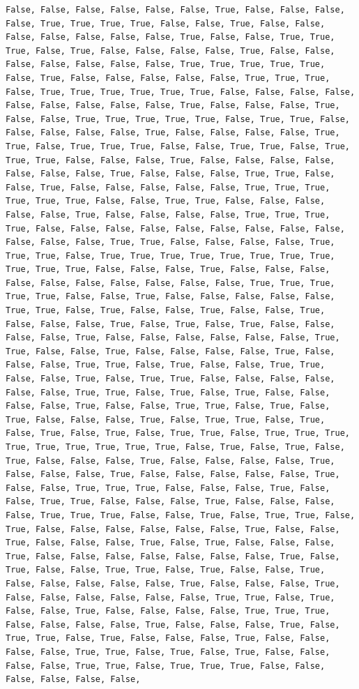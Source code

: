 \documentclass[
  letterpaper,
  DIV=11,
  numbers=noendperiod]{scrartcl}
\begin{document}
\begin{verbatim}
False, False, False, False, False, False, True, False, False, False, False, True, True, True, True, False, False, True, False, False, False, False, False, False, False, True, False, False, True, True, True, False, True, False, False, False, False, True, False, False, False, False, False, False, False, True, True, True, True, True, False, True, False, False, False, False, False, True, True, True, False, True, True, True, True, True, True, False, False, False, False, False, False, False, False, False, True, False, False, False, True, False, False, True, True, True, True, True, False, True, True, False, False, False, False, False, True, False, False, False, False, True, True, False, True, True, True, False, False, True, True, False, True, True, True, False, False, False, True, False, False, False, False, False, False, False, True, False, False, False, True, True, False, False, True, False, False, False, False, False, True, True, True, True, True, True, False, False, True, True, False, False, False, False, False, True, False, False, False, False, True, True, True, True, False, False, False, False, False, False, False, False, False, False, False, False, True, True, False, False, False, False, True, True, True, False, True, True, True, True, True, True, True, True, True, True, True, False, False, False, True, False, False, False, False, False, False, False, False, False, False, True, True, True, True, True, False, False, True, False, False, False, False, False, True, True, False, True, False, False, True, False, False, True, False, False, False, True, False, True, False, True, False, False, False, False, True, False, False, False, False, False, False, True, True, False, False, True, False, False, False, False, True, False, False, False, True, True, False, True, False, False, True, True, False, False, True, False, True, True, False, False, False, False, False, False, True, True, False, True, False, True, False, False, False, False, True, False, False, True, True, False, True, False, True, False, False, False, True, False, True, True, False, True, False, True, False, True, False, True, True, False, True, True, True, True, True, True, True, True, True, False, True, False, True, False, True, False, False, False, True, False, False, False, False, True, False, False, False, True, False, False, False, False, False, True, False, False, True, True, True, False, False, False, True, False, False, True, True, False, False, False, True, False, False, False, False, True, True, True, False, False, True, False, True, True, False, True, False, False, False, False, False, False, True, False, False, True, False, False, False, True, False, True, False, False, False, True, False, False, False, False, False, False, False, True, False, True, False, False, True, True, False, True, False, False, True, False, False, False, False, False, True, False, False, False, True, False, False, False, False, False, False, True, True, False, True, False, False, True, False, False, False, False, True, True, True, False, False, False, False, True, False, False, False, True, False, True, True, False, True, False, False, False, True, False, False, False, False, True, True, False, True, False, True, False, False, False, False, True, True, False, True, True, True, False, False, False, False, False, False, 
\end{verbatim}
\end{document}
